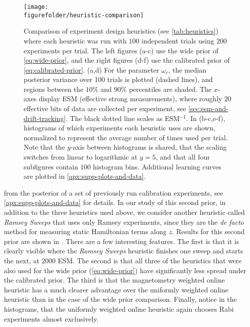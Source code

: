 \documentclass[aps,nofootinbib,twocolumn,superscriptaddress]{revtex4}
\newcommand{\figurefolder}{../fig}
\begin{document}
\begin{figure*}[t!]
    \centering
    \texttt{[image: \\figurefolder/heuristic-comparison]}
    \caption{Comparison of experiment design heuristics
    (see \autoref{tab:heuristics}) where each heuristic was run
    with $100$ independent trials using $200$ experiments per trial.
    The left figures (a-c) use the wide prior of \autoref{eq:wide-prior},
    and the right figures (d-f) use the calibrated prior of
    \autoref{eq:calibrated-prior}.
    (a,d) For the parameter $\omega_e$, the median posterior variance
    over 100 trials is plotted (dashed lines), and
    regions between the $10\%$ and $90\%$ percentiles are shaded.
    The $x$-axes display ESM (effective strong measurements), where
    roughly $20$ effective bits of data are collected per experiment,
    see \autoref{sec:esm-and-drift-tracking}.
    The black dotted line scales as ESM$^{-1}$.
    In (b-c,e-f), histograms of which experiments each heuristic uses are
    shown, normalized to represent the average number of times
    used per trial.
    Note that the $y$-axis between histograms is shared, that
    the scaling switches from linear to logarithmic at $y=5$, and
    that all four subfigures contain $100$ histogram bins.
    Additional learning curves are plotted in \autoref{apx:supp-plots-and-data}.
    }
    \label{fig:heuristic-comparison}
\end{figure*}

from the posterior of a set of previously run calibration
experiments, see \autoref{apx:supp-plots-and-data} for
details.
In our study of this second prior, in addition to
the three heuristics used above,
we consider another heuristic called \textit{Ramsey Sweeps} that uses only
Ramsey experiments, since they are the \textit{de facto} method for
measuring static Hamiltonian terms along $z$.
Results for this second prior
are shown in .
There are a few interesting features.
The first is that it is clearly visible where the \textit{Ramsey Sweeps}
heuristic finishes one sweep and starts the next, at 2000 ESM.
The second is that all three of the heuristics that were also used
for the wide prior (\autoref{eq:wide-prior}) have significantly
less spread under the calibrated prior.
The third is that the magnetometry weighted online heuristic has a much
clearer advantage over the uniformly weighted online heuristic than in
the case of the wide prior comparison.
Finally, notice in the histograms, that the uniformly weighted
online heuristic again chooses Rabi experiments almost
exclusively.
\end{document}
